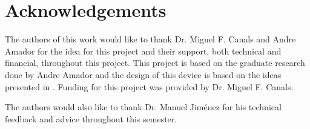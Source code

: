 \section{Acknowledgements}
The authors of this work would like to thank Dr. Miguel F. Canals and Andre Amador for the idea for this project and their support, both technical and financial, throughout this project.  This project is based on the graduate research done by Andre Amador and the design of this device is based on the ideas presented in  \cite{Canals2012}.  Funding for this project was provided by Dr. Miguel F. Canals.

The authors would also like to thank Dr. Manuel Jim\'{e}nez for his technical feedback and advice throughout this semester.